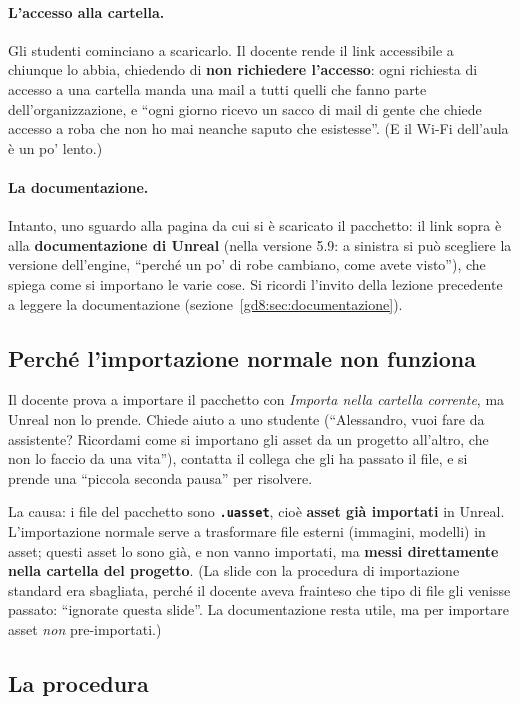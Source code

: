 \paragraph{L'accesso alla cartella.} Gli studenti cominciano a scaricarlo. Il
docente rende il link accessibile a chiunque lo abbia, chiedendo di \textbf{non
richiedere l'accesso}: ogni richiesta di accesso a una cartella manda una mail a
tutti quelli che fanno parte dell'organizzazione, e ``ogni giorno ricevo un
sacco di mail di gente che chiede accesso a roba che non ho mai neanche saputo
che esistesse''. (E il Wi-Fi dell'aula è un po' lento.)

\paragraph{La documentazione.} Intanto, uno sguardo alla pagina da cui si è
scaricato il pacchetto: il link sopra è alla \textbf{documentazione di Unreal}
(nella versione 5.9: a sinistra si può scegliere la versione dell'engine,
``perché un po' di robe cambiano, come avete visto''), che spiega come si
importano le varie cose. Si ricordi l'invito della lezione precedente a leggere
la documentazione (sezione~\ref{gd8:sec:documentazione}).

\subsection{Perché l'importazione normale non funziona}

Il docente prova a importare il pacchetto con \emph{Importa nella cartella
corrente}, ma Unreal non lo prende. Chiede aiuto a uno studente (``Alessandro,
vuoi fare da assistente? Ricordami come si importano gli asset da un progetto
all'altro, che non lo faccio da una vita''), contatta il collega che gli ha
passato il file, e si prende una ``piccola seconda pausa'' per risolvere.

La causa: i file del pacchetto sono \textbf{\texttt{.uasset}}, cioè
\textbf{asset già importati} in Unreal. L'importazione normale serve a
trasformare file esterni (immagini, modelli) in asset; questi asset lo sono già,
e non vanno importati, ma \textbf{messi direttamente nella cartella del
progetto}. (La slide con la procedura di importazione standard era sbagliata,
perché il docente aveva frainteso che tipo di file gli venisse passato: ``ignorate
questa slide''. La documentazione resta utile, ma per importare asset
\emph{non} pre-importati.)

\subsection{La procedura}

